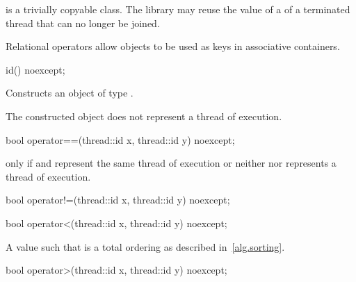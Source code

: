 \pnum
{} is a trivially copyable class.
The library may reuse the value of a  of a terminated thread that can no longer be joined.

\pnum
\begin{note} Relational operators allow  objects to be used as
keys in associative containers. \end{note}

%
\begin{itemdecl}
id() noexcept;
\end{itemdecl}

\begin{itemdescr}
\pnum\effects Constructs an object of type .

\pnum\postconditions The constructed object does not represent a thread of execution.
\end{itemdescr}

%
\begin{itemdecl}
bool operator==(thread::id x, thread::id y) noexcept;
\end{itemdecl}

\begin{itemdescr}
\pnum\returns {} only if  and  represent the same
thread of execution or neither  nor  represents a thread of
execution.
\end{itemdescr}

%
\begin{itemdecl}
bool operator!=(thread::id x, thread::id y) noexcept;
\end{itemdecl}

\begin{itemdescr}
\pnum\returns {}
\end{itemdescr}

%
\begin{itemdecl}
bool operator<(thread::id x, thread::id y) noexcept;
\end{itemdecl}

\begin{itemdescr}
\pnum
\returns A value such that  is a total ordering as described in~\ref{alg.sorting}.
\end{itemdescr}

%
\begin{itemdecl}
bool operator>(thread::id x, thread::id y) noexcept;
\end{itemdecl}

